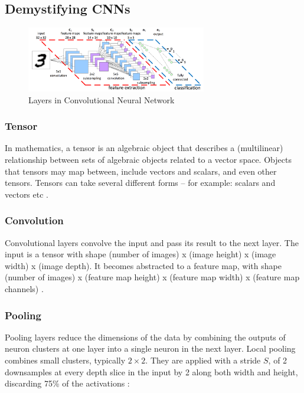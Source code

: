 \documentclass[12pt, a4paper]{report}
\begin{document}
\subsection{Demystifying CNNs}
\label{subsec:layrcnn}

\begin{figure}[!htbp]
    \centering
    \includegraphics[width=0.7\textwidth]{cnn_layers.png}
    \caption[Layers in Convolutional Neural Network]{Layers in Convolutional Neural Network}
    \label{fig:5.3}
\end{figure}

\subsubsection{Tensor}
\label{subsub:tensor}

In mathematics, a tensor is an algebraic object that describes a (multilinear) relationship between sets of algebraic objects related to a vector space. Objects that tensors may map between, include vectors and scalars, and even other tensors. Tensors can take several different forms – for example: scalars and vectors etc \cite{wiki:tensor}.

\subsubsection{Convolution}
\label{subsub:convolution}

Convolutional layers convolve the input and pass its result to the next layer. The input is a tensor with shape (number of images) x (image height) x (image width) x (image depth). It becomes abstracted to a feature map, with shape (number of images) x (feature map height) x (feature map width) x (feature map channels) \cite{wiki:cnns}.

\subsubsection{Pooling}
\label{subsub:pooling}

Pooling layers reduce the dimensions of the data by combining the outputs of neuron clusters at one layer into a single neuron in the next layer. Local pooling combines small clusters, typically $2\times 2$. They are applied with a stride $S$, of 2 downsamples at every depth slice in the input by 2 along both width and height, discarding 75\% of the activations \cite{wiki:cnns}:
\end{document}
